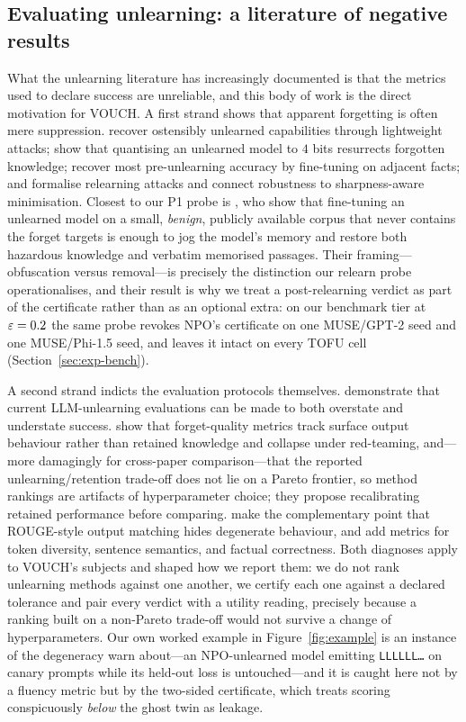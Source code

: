 \subsection{Evaluating unlearning: a literature of negative results}

What the unlearning literature has increasingly documented is that the metrics used
to declare success are unreliable, and this body of work is the direct motivation for
VOUCH. A first strand shows that apparent forgetting is often mere suppression.
\citet{lucki2024adversarial} recover ostensibly unlearned capabilities through
lightweight attacks; \citet{zhang2025quantization} show that quantising an unlearned
model to $4$ bits resurrects forgotten knowledge; \citet{deeb2024remove} recover most
pre-unlearning accuracy by fine-tuning on adjacent facts; and \citet{fan2025relearning}
formalise relearning attacks and connect robustness to sharpness-aware minimisation.
Closest to our P1 probe is \citet{hu2025jogging}, who show that fine-tuning an
unlearned model on a small, \emph{benign}, publicly available corpus that never
contains the forget targets is enough to jog the model's memory and restore both
hazardous knowledge and verbatim memorised passages. Their framing---obfuscation
versus removal---is precisely the distinction our relearn probe operationalises, and
their result is why we treat a post-relearning verdict as part of the certificate
rather than as an optional extra: on our benchmark tier at $\varepsilon = 0.2$ the same probe
revokes NPO's certificate on one MUSE/GPT-2 seed and one MUSE/Phi-1.5 seed, and leaves
it intact on every TOFU cell (Section~\ref{sec:exp-bench}).

A second strand indicts the evaluation protocols themselves.
\citet{feng2025existing} demonstrate that current LLM-unlearning evaluations can be
made to both overstate and understate success. \citet{wang2025towards} show that
forget-quality metrics track surface output behaviour rather than retained knowledge
and collapse under red-teaming, and---more damagingly for cross-paper
comparison---that the reported unlearning/retention trade-off does not lie on a Pareto
frontier, so method rankings are artifacts of hyperparameter choice; they propose
recalibrating retained performance before comparing. \citet{yuan2025closer} make the
complementary point that ROUGE-style output matching hides degenerate behaviour, and
add metrics for token diversity, sentence semantics, and factual correctness. Both
diagnoses apply to VOUCH's subjects and shaped how we report them: we do not rank
unlearning methods against one another, we certify each one against a declared
tolerance and pair every verdict with a utility reading, precisely because a ranking
built on a non-Pareto trade-off would not survive a change of hyperparameters. Our own
worked example in Figure~\ref{fig:example} is an instance of the degeneracy
\citet{yuan2025closer} warn about---an NPO-unlearned model emitting
\texttt{LLLLLL\ldots} on canary prompts while its held-out loss is untouched---and it
is caught here not by a fluency metric but by the two-sided certificate, which treats
scoring conspicuously \emph{below} the ghost twin as leakage.

